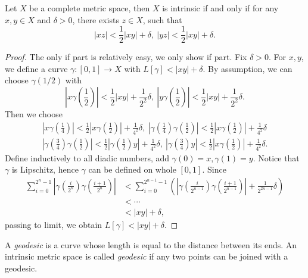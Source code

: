 \begin{prop}\label{prop:delta midpoint}
    Let $X$ be a complete metric space, then $X$ is intrinsic if and only if for any $x,y\in X$ and $\delta>0$, there exists $z\in X$, such that
    \[|xz|<\frac{1}{2}|xy|+\delta,\ |yz|<\frac{1}{2}|xy|+\delta.\]
\end{prop}
\begin{proof}
    The only if part is relatively easy, we only show if part.
    Fix $\delta>0$.
    For $x,y$, we define a curve $\gamma:[0,1]\to X$ with $L[\gamma]<|xy|+\delta$.
    By assumption, we can choose $\gamma(1/2)$ with
    \[\left|x\gamma\left(\frac{1}{2}\right)\right|<\frac{1}{2}|xy|+\frac{1}{2^2}\delta,\ \left|y\gamma\left(\frac{1}{2}\right)\right|<\frac{1}{2}|xy|+\frac{1}{2^2}\delta.\]
    Then we choose
    \begin{gather*}
        \left|x\gamma\left(\frac{1}{4}\right)\right|<\frac{1}{2}\left|x\gamma\left(\frac{1}{2}\right)\right|+\frac{1}{4^2}\delta,\ \left|\gamma\left(\frac{1}{4}\right)\gamma\left(\frac{1}{2}\right)\right|<\frac{1}{2}\left|x\gamma\left(\frac{1}{2}\right)\right|+\frac{1}{4^2}\delta\\
        \left|\gamma\left(\frac{3}{4}\right)\gamma\left(\frac{1}{2}\right)\right|<\frac{1}{2}\left|\gamma\left(\frac{1}{2}\right)y\right|+\frac{1}{4^2}\delta,\ \left|\gamma\left(\frac{3}{4}\right)y\right|<\frac{1}{2}\left|x\gamma\left(\frac{1}{2}\right)\right|+\frac{1}{4^2}\delta.
    \end{gather*}
    Define inductively to all diadic numbers, add $\gamma(0)=x,\gamma(1)=y$.
    Notice that $\gamma$ is Lipschitz, hence $\gamma$ can be defined on whole $[0,1]$.
    Since
    \begin{align*}
        \sum_{i=0}^{2^n-1}\left|\gamma\left(\frac{i}{2^n}\right)\gamma\left(\frac{i+1}{2^n}\right)\right|&<\sum_{i=0}^{2^{n-1}-1}\left(\left|\gamma\left(\frac{i}{2^{n-1}}\right)\gamma\left(\frac{i+1}{2^{n-1}}\right)\right|+\frac{1}{2^{2n-1}}\delta\right)\\
        &<\cdots\\
        &<|xy|+\delta,
    \end{align*}
    passing to limit, we obtain $L[\gamma]<|xy|+\delta$.
\end{proof}

\begin{defn}
    A \emph{geodesic} is a curve whose length is equal to the distance between its ends.
    An intrinsic metric space is called \emph{geodesic} if any two points can be joined with a geodesic.
\end{defn}

